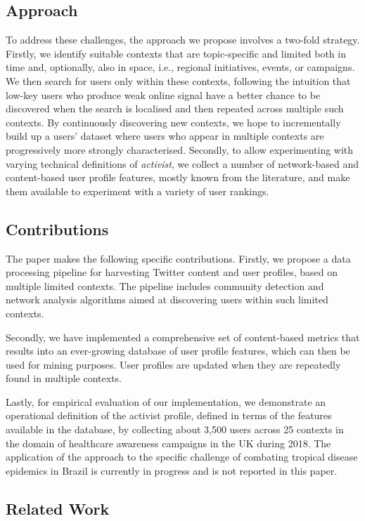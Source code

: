 \subsection{Approach}

To address these challenges, the approach we propose involves a two-fold strategy. 
Firstly, we identify suitable contexts that are topic-specific and limited both in time and, optionally, also in space, i.e., regional initiatives, events, or campaigns.
We then search for users only within these contexts, following the intuition that low-key users who produce weak online signal have a better chance to be discovered when the search is localised and then repeated across multiple such contexts.
By continuously discovering new contexts, we hope to incrementally build up a users' dataset where users who appear in multiple contexts are progressively more strongly characterised.
%
Secondly, to allow experimenting with varying technical definitions of \textit{activist}, we collect a number of network-based and content-based user profile features, mostly known from the literature, and make them available to experiment with a variety of user rankings.

\subsection{ Contributions}
The paper makes the following specific contributions.
%
Firstly, we propose a data processing pipeline for harvesting Twitter content and user profiles, based on multiple limited contexts. 
The pipeline includes community detection and network analysis algorithms aimed at discovering users within such limited contexts.

Secondly, we have implemented a comprehensive set of content-based metrics that results into an ever-growing database of user profile features, which can then be used for mining purposes. 
User profiles are updated when they are repeatedly found in multiple contexts.

Lastly, for empirical evaluation of our implementation, we demonstrate an operational definition of the activist profile, defined in terms of the features available in the database, by collecting about 3,500 users  across 25 contexts in the domain of healthcare awareness campaigns in the UK during 2018. 
The application of the approach to the specific challenge of combating tropical disease epidemics in Brazil is currently in progress and is not reported in this paper.

\subsection{Related Work}  \label{sec:related}

